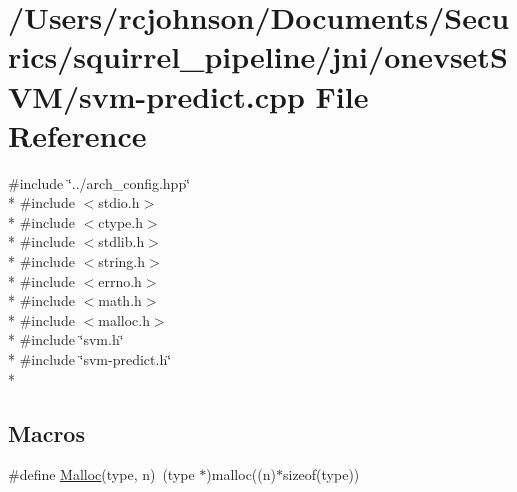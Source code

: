 \hypertarget{svm-predict_8cpp}{\section{/\-Users/rcjohnson/\-Documents/\-Securics/squirrel\-\_\-pipeline/jni/onevset\-S\-V\-M/svm-\/predict.cpp File Reference}
\label{svm-predict_8cpp}
}
{\ttfamily \#include \char`\"{}../arch\-\_\-config.\-hpp\char`\"{}}\\*
{\ttfamily \#include $<$stdio.\-h$>$}\\*
{\ttfamily \#include $<$ctype.\-h$>$}\\*
{\ttfamily \#include $<$stdlib.\-h$>$}\\*
{\ttfamily \#include $<$string.\-h$>$}\\*
{\ttfamily \#include $<$errno.\-h$>$}\\*
{\ttfamily \#include $<$math.\-h$>$}\\*
{\ttfamily \#include $<$malloc.\-h$>$}\\*
{\ttfamily \#include \char`\"{}svm.\-h\char`\"{}}\\*
{\ttfamily \#include \char`\"{}svm-\/predict.\-h\char`\"{}}\\*
\subsection*{Macros}
\begin{DoxyCompactItemize}
\item 
\#define \hyperlink{svm-predict_8cpp_a9191047fd644a5f519152ecb4aa60357}{Malloc}(type, n)~(type $\ast$)malloc((n)$\ast$sizeof(type))
\end{DoxyCompactItemize}
